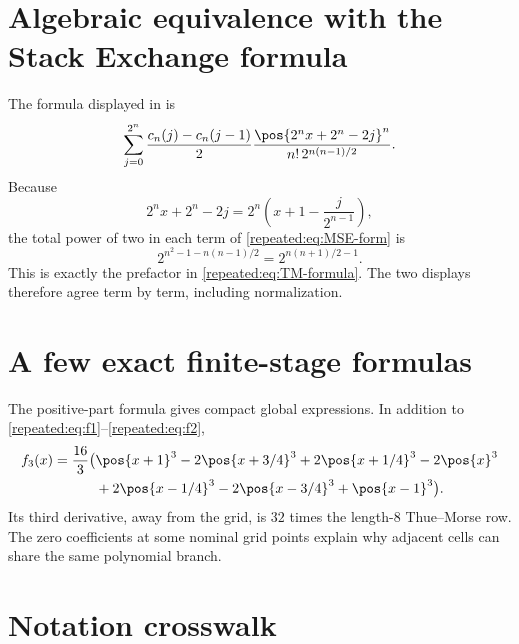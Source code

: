 \documentclass[11pt,oneside]{article}
\theoremstyle{definition}
\theoremstyle{remark}
\begin{document}
\section{Algebraic equivalence with the Stack Exchange formula}
\label{repeated:app:equivalence}

The formula displayed in \cite{repeated:mseanswer} is
\begin{equation}
 \sum_{j=0}^{2^n}
 \frac{c_n(j)-c_n(j-1)}{2}
 \frac{\pos{2^nx+2^n-2j}^{n}}{n!\,2^{n(n-1)/2}}.           \label{repeated:eq:MSE-form}
\end{equation}
Because
\[
 2^nx+2^n-2j=2^n\left(x+1-\frac{j}{2^{n-1}}\right),
\]
the total power of two in each term of \eqref{repeated:eq:MSE-form} is
\[
 2^{n^2-1-n(n-1)/2}=2^{n(n+1)/2-1}.
\]
This is exactly the prefactor in \eqref{repeated:eq:TM-formula}.  The two displays therefore agree
term by term, including normalization.

\section{A few exact finite-stage formulas}
\label{repeated:app:first-formulas}

The positive-part formula gives compact global expressions.  In addition to
\eqref{repeated:eq:f1}--\eqref{repeated:eq:f2},
\begin{align}
 f_3(x)=\frac{16}{3}\bigl(&\pos{x+1}^{3}-2\pos{x+3/4}^{3}
 +2\pos{x+1/4}^{3}-2\pos{x}^{3}\notag\\
 &+2\pos{x-1/4}^{3}-2\pos{x-3/4}^{3}+\pos{x-1}^{3}\bigr). \label{repeated:eq:f3-global}
\end{align}
Its third derivative, away from the grid, is $32$ times the length-$8$ Thue--Morse row.
The zero coefficients at some nominal grid points explain why adjacent cells can share the
same polynomial branch.

\section{Notation crosswalk}
\label{repeated:app:notation}
\end{document}
